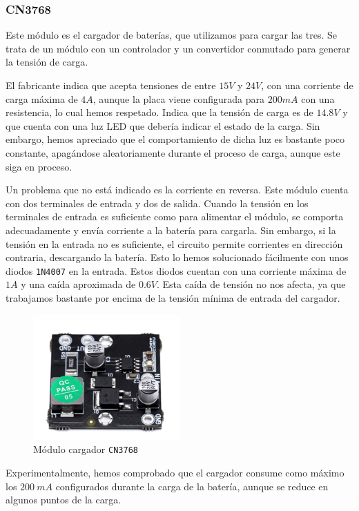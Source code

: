\subsubsection{CN3768}

Este módulo es el cargador de baterías, que utilizamos para cargar las tres. Se trata de un módulo con un controlador y un convertidor conmutado para generar la tensión de carga. 

El fabricante indica que acepta tensiones de entre $15 V$ y $24 V$, con una corriente de carga máxima de $4 A$, aunque la placa viene configurada para $200 mA$ con una resistencia, lo cual hemos respetado. Indica que la tensión de carga es de $14.8 V$ y que cuenta con una luz LED que debería indicar el estado de la carga. Sin embargo, hemos apreciado que el comportamiento de dicha luz es bastante poco constante, apagándose aleatoriamente durante el proceso de carga, aunque este siga en proceso. \cite{consonanceCN3768}

Un problema que no está indicado es la corriente en reversa. Este módulo cuenta con dos terminales de entrada y dos de salida. Cuando la tensión en los terminales de entrada es suficiente como para alimentar el módulo, se comporta adecuadamente y envía corriente a la batería para cargarla. Sin embargo, si la tensión en la entrada no es suficiente, el circuito permite corrientes en dirección contraria, descargando la batería. Esto lo hemos solucionado fácilmente con unos diodos \texttt{1N4007} en la entrada. Estos diodos cuentan con una corriente máxima de $1 A$ y una caída aproximada de $0.6 V$. Esta caída de tensión no nos afecta, ya que trabajamos bastante por encima de la tensión mínima de entrada del cargador.

\begin{figure}[H]
    \centering
    \includegraphics[width=0.5\textwidth]{images/2-hardware/componentes/CN3768.png}
    \caption{Módulo cargador \texttt{CN3768}}
    \label{fig:hardware/modulos/cn3768}
\end{figure}

Experimentalmente, hemos comprobado que el cargador consume como máximo los $200\ mA$ configurados durante la carga de la batería, aunque se reduce en algunos puntos de la carga.